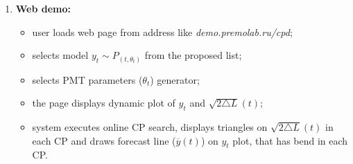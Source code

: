 \documentclass[a4paper,12pt]{report} %
\theoremstyle{definition}
\begin{document}
\begin{enumerate}
\item \textbf{Web demo: } 

\begin{itemize}
\item user loads web page from address like \textit{demo.premolab.ru/cpd};
\item selects  model  $y_t \sim P_{(t,\theta_t)}$ from the proposed list;
\item selects PMT parameters ($\theta_t$) generator;
\item the page displays dynamic plot of $y_t$ and  $\sqrt{2 \triangle L}(t)$;
\item system executes online CP search, displays triangles on  $\sqrt{2 \triangle L}(t)$ in each CP and draws forecast line ($\overline{y}(t)$) on $y_t$ plot, that has bend in each CP. 
\end{itemize}

\end{enumerate}
\end{document}
